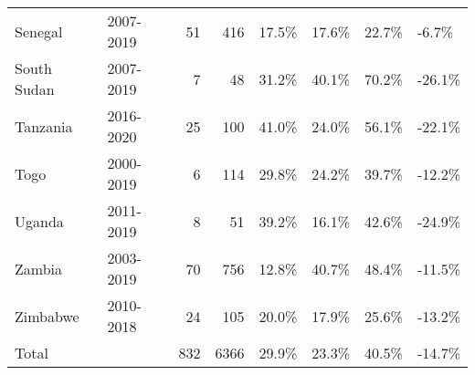 \begin{table}[ht]
\begin{tabular}{llrrllll}
  Senegal & 2007-2019 &  51 & 416 & 17.5\% & 17.6\% & 22.7\% & -6.7\% \\ 
  South Sudan & 2007-2019 &   7 &  48 & 31.2\% & 40.1\% & 70.2\% & -26.1\% \\ 
  Tanzania & 2016-2020 &  25 & 100 & 41.0\% & 24.0\% & 56.1\% & -22.1\% \\ 
  Togo & 2000-2019 &   6 & 114 & 29.8\% & 24.2\% & 39.7\% & -12.2\% \\ 
  Uganda & 2011-2019 &   8 &  51 & 39.2\% & 16.1\% & 42.6\% & -24.9\% \\ 
  Zambia & 2003-2019 &  70 & 756 & 12.8\% & 40.7\% & 48.4\% & -11.5\% \\ 
  Zimbabwe & 2010-2018 &  24 & 105 & 20.0\% & 17.9\% & 25.6\% & -13.2\% \\ 
  Total &   & 832 & 6366 & 29.9\% & 23.3\% & 40.5\% & -14.7\% \\ 
   \hline
\end{tabular}
\end{table}
